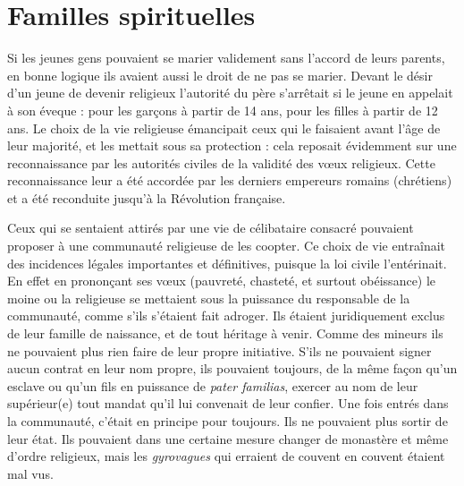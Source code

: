 
\chapter{Familles spirituelles}


 Si les jeunes gens pouvaient se marier validement sans l'accord de leurs parents, en bonne logique ils avaient aussi le droit de ne pas se marier. Devant le désir d'un jeune de devenir religieux l'autorité du père s'arrêtait si le jeune en appelait à son éveque : pour les garçons à partir de 14 ans, pour les filles à partir de 12 ans. Le choix de la vie religieuse émancipait ceux qui le faisaient avant l'âge de leur majorité, et les mettait sous sa protection : cela reposait évidemment sur une reconnaissance par les autorités civiles de la validité des vœux religieux. Cette reconnaissance leur a été accordée par les derniers empereurs romains (chrétiens) et a été reconduite jusqu'à la Révolution française.

 Ceux qui se sentaient attirés par une vie de célibataire consacré pouvaient proposer à une communauté religieuse de les coopter. Ce choix de vie entraînait des incidences légales importantes et définitives, puisque la loi civile l'entérinait. En effet en prononçant ses vœux (pauvreté, chasteté, et surtout obéissance) le moine ou la religieuse se mettaient sous la puissance du responsable de la communauté, comme s'ils s'étaient fait adroger. Ils étaient juridiquement exclus de leur famille de naissance, et de tout héritage à venir. Comme des mineurs ils ne pouvaient plus rien faire de leur propre initiative. S'ils ne pouvaient signer aucun contrat en leur nom propre, ils pouvaient toujours, de la même façon qu'un esclave ou qu'un fils en puissance de \emph{pater familias}, exercer au nom de leur supérieur(e) tout mandat qu'il lui convenait de leur confier. Une fois entrés dans la communauté, c'était en principe pour toujours. Ils ne pouvaient plus sortir de leur état. Ils pouvaient dans une certaine mesure changer de monastère et même d'ordre religieux, mais les \emph{gyrovagues} qui erraient de couvent en couvent étaient mal vus. 

